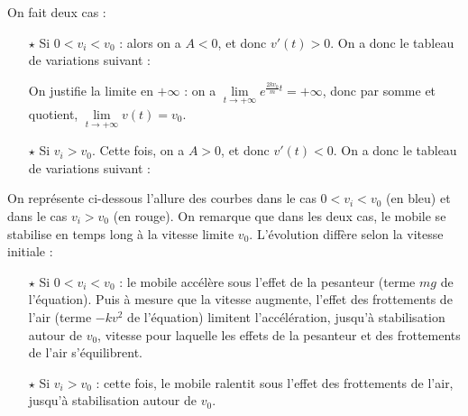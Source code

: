 \documentclass[a4paper, 11pt,reqno]{article}
\begin{document}
\begin{correction}
\begin{enumerate}
On fait deux cas :
\begin{itemize}
\item[$\star$] Si $0<v_i<v_0$ : alors on a $A<0$, et donc $v'(t) >0$. On a donc le tableau de variations suivant :
\begin{center}
\end{center}
On justifie la limite en $+\infty$ : on a $\lim\limits_{t\to +\infty} e^{\frac{2kv_0}{m}t} = +\infty$, donc par somme et quotient, $\lim\limits_{t\to +\infty} v(t) = v_0$.
\item[$\star$] Si $v_i>v_0$. Cette fois, on a $A>0$, et donc $v'(t) <0$. On a donc le tableau de variations suivant :
\begin{center}
\end{center}
\end{itemize}
On repr\'esente ci-dessous l'allure des courbes dans le cas $0<v_i<v_0$ (en bleu) et dans le cas $v_i>v_0$ (en rouge). On remarque que dans les deux cas, le mobile se stabilise en temps long \`a la vitesse limite $v_0$. L'\'evolution diff\`ere selon la vitesse initiale :
\begin{itemize}
\item[$\star$] Si $0<v_i<v_0$ : le mobile acc\'el\`ere sous l'effet de la pesanteur (terme $mg$ de l'\'equation). Puis \`a mesure que la vitesse augmente, l'effet des frottements de l'air (terme $-kv^2$ de l'\'equation) limitent l'acc\'el\'eration, jusqu'\`a stabilisation autour de $v_0$, vitesse pour laquelle les effets de la pesanteur et des frottements de l'air s'\'equilibrent.
\item[$\star$] Si $v_i>v_0$ : cette fois, le mobile ralentit sous l'effet des frottements de l'air, jusqu'\`a stabilisation autour de $v_0$.
\end{itemize}
\end{enumerate}
\end{correction}
\end{document}
